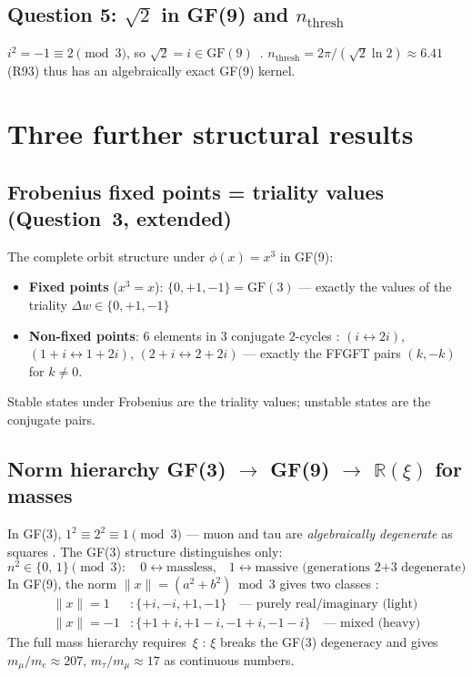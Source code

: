 \subsection{Question 5: $\sqrt{2}$ in GF(9) and $n_\text{thresh}$}

$i^2 = -1\equiv 2\pmod{3}$, so $\sqrt{2}=i\in\mathrm{GF}(9)$~\BM.
$n_\text{thresh} = 2\pi/(\sqrt{2}\ln 2)\approx 6.41$ (R93) thus has
an algebraically exact GF(9) kernel.

\section{Three further structural results}
\label{sec:drei_ergebnisse}

\subsection{Frobenius fixed points = triality values (Question~3, extended)}

The complete orbit structure under $\phi(x)=x^3$ in GF(9):
\begin{itemize}
  \item \textbf{Fixed points} ($x^3=x$): $\{0,+1,-1\} = \mathrm{GF}(3)$ —
    exactly the values of the triality $\Delta w\in\{0,+1,-1\}$ \BM
  \item \textbf{Non-fixed points}: 6 elements in 3 conjugate $2$-cycles \BM:
    $(i\leftrightarrow 2i)$, $(1{+}i\leftrightarrow 1{+}2i)$,
    $(2{+}i\leftrightarrow 2{+}2i)$ — exactly the FFGFT pairs $(k,-k)$ for $k\neq 0$.
\end{itemize}
Stable states under Frobenius are the triality values;
unstable states are the conjugate pairs.

\subsection{Norm hierarchy GF(3) $\to$ GF(9) $\to$ $\mathbb{R}(\xi)$ for masses}

In GF(3), $1^2 \equiv 2^2 \equiv 1 \pmod{3}$ — muon and tau are
\emph{algebraically degenerate} as squares \BM.
The GF(3) structure distinguishes only:
\begin{equation}
  n^2 \in \{0,\, 1\} \pmod{3}: \quad
  0 \leftrightarrow \text{massless,}\quad
  1 \leftrightarrow \text{massive (generations 2+3 degenerate)}
\end{equation}
In GF(9), the norm $\|x\| = (a^2+b^2)\bmod 3$ gives two classes \BM:
\begin{align*}
  \|x\| = 1&: \{+i,-i,+1,-1\}\quad \text{— purely real/imaginary (light)} \\
  \|x\| = -1&: \{+1+i,+1-i,-1+i,-1-i\}\quad \text{— mixed (heavy)}
\end{align*}
The full mass hierarchy requires~$\xi$ \KM:
$\xi$ breaks the GF(3) degeneracy and gives $m_\mu/m_e\approx 207$,
$m_\tau/m_\mu\approx 17$ as continuous numbers.

